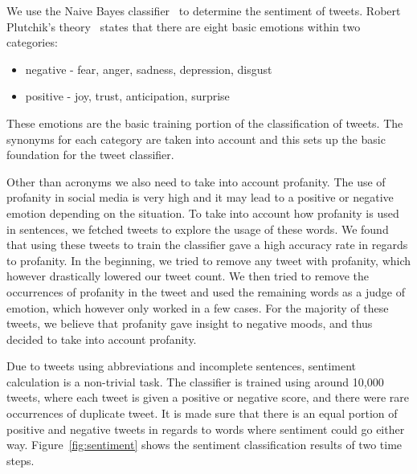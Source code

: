 We use the Naive Bayes classifier~\cite{pak2010twitter} to determine the sentiment of tweets. Robert Plutchik's theory~\cite{Plutchik2002} states that there are eight basic emotions within two categories:
\begin{itemize}
\vspace{-0.05in}
\setlength{\topsep}{-0.1in}
\setlength{\itemsep}{-0.05in}
\item negative - fear, anger, sadness, depression, disgust
\item positive - joy, trust, anticipation, surprise
\end{itemize}
\vspace{-0.05in}
These emotions are the basic training portion of the classification of tweets. The synonyms for each category are taken into account and this sets up the basic foundation for the tweet classifier.

Other than acronyms we also need to take into account profanity. The use of profanity in social media is very high and it may lead to a positive or negative emotion depending on the situation. To take into account how profanity is used in sentences, we fetched tweets to explore the usage of these words. We found that using these tweets to train the classifier gave a high accuracy rate in regards to profanity. In the beginning, we tried to remove any tweet with profanity, which however drastically lowered our tweet count. We then tried to remove the occurrences of profanity in the tweet and used the remaining words as a judge of emotion, which however only worked in a few cases. For the majority of these tweets, we believe that profanity gave insight to negative moods, and thus decided to take into account profanity.

Due to tweets using abbreviations and incomplete sentences, sentiment calculation is a non-trivial task. The classifier is trained using around 10,000 tweets, where each tweet is given a positive or negative score, and there were rare occurrences of duplicate tweet. It is made sure that there is an equal portion of positive and negative tweets in regards to words where sentiment could go either way. Figure~\ref{fig:sentiment} shows the sentiment classification results of two time steps.

